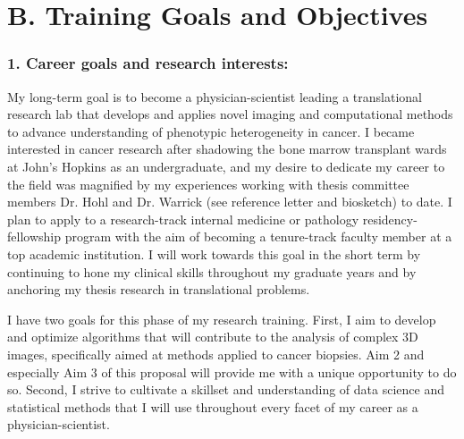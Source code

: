 \documentclass{NIHGrant}
\begin{document}
\section*{B. Training Goals and Objectives}
\subsubsection*{1. Career goals and research interests:}
My long-term goal is to become a physician-scientist leading a translational research lab that develops and applies novel imaging and computational methods to advance understanding of phenotypic heterogeneity in cancer. I became interested in cancer research after shadowing the bone marrow transplant wards at John's Hopkins as an undergraduate, and my desire to dedicate my career to the field was magnified by my experiences working with thesis committee members Dr. Hohl and Dr. Warrick (see reference letter and biosketch) to date. I plan to apply to a research-track internal medicine or pathology residency-fellowship program with the aim of becoming a tenure-track faculty member at a top academic institution. I will work towards this goal in the short term by continuing to hone my clinical skills throughout my graduate years and by anchoring my thesis research in translational problems.

I have two goals for this phase of my research training. First, I aim to develop and optimize algorithms that will contribute to the analysis of complex 3D images, specifically aimed at methods applied to cancer biopsies. Aim 2 and especially Aim 3 of this proposal will provide me with a unique opportunity to do so. Second, I strive to cultivate a  skillset and understanding of data science and statistical methods that I will use throughout every facet of my career as a physician-scientist.
\end{document}
